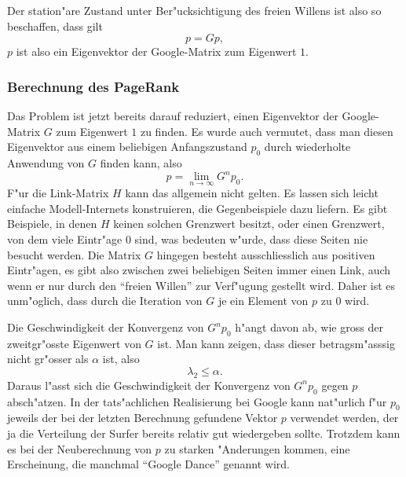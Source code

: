 Der station"are Zustand unter Ber"ucksichtigung des freien Willens ist also
so beschaffen, dass gilt
\[
p=Gp,
\]
$p$ ist also ein Eigenvektor der Google-Matrix zum Eigenwert $1$.

\subsubsection{Berechnung des PageRank}
Das Problem ist jetzt bereits darauf reduziert, einen Eigenvektor der
Google-Matrix $G$ zum Eigenwert $1$ zu finden.
Es wurde auch vermutet, dass man diesen Eigenvektor
aus einem beliebigen Anfangszustand $p_0$ durch wiederholte Anwendung von
$G$ finden kann, also
\[
p=\lim_{n\to\infty}G^np_0.
\]
F"ur die Link-Matrix $H$ kann das allgemein nicht gelten.
Es lassen sich leicht einfache Modell-Internets konstruieren,
die Gegenbeispiele dazu liefern. Es gibt Beispiele, in denen
$H$ keinen solchen Grenzwert besitzt, oder einen Grenzwert, von dem
viele Eintr"age $0$ sind, was bedeuten w"urde, dass diese Seiten nie besucht
werden.
Die Matrix $G$ hingegen besteht ausschliesslich aus positiven Eintr"agen, es
gibt also zwischen zwei beliebigen Seiten immer einen Link, auch wenn er nur
durch den ``freien Willen'' zur Verf"ugung gestellt wird.
Daher ist es unm"oglich,
dass durch die Iteration von $G$ je ein Element von $p$ zu $0$ wird.

Die Geschwindigkeit der Konvergenz von $G^np_0$ h"angt davon ab, wie gross der
zweitgr"osste Eigenwert von $G$ ist.
Man kann zeigen, dass dieser betragsm"asssig
nicht gr"osser als $\alpha$ ist, also
\[
\lambda_2\le \alpha.
\]
Daraus l"asst sich die Geschwindigkeit der Konvergenz von $G^np_0$ gegen $p$
absch"atzen. In der tats"achlichen Realisierung bei Google kann nat"urlich
f"ur $p_0$ jeweils der bei der letzten Berechnung gefundene Vektor $p$ verwendet
werden, der ja die Verteilung der Surfer bereits relativ gut wiedergeben sollte.
Trotzdem kann es bei der Neuberechnung von $p$ zu starken "Anderungen kommen,
eine Erscheinung, die manchmal ``Google Dance'' genannt wird.
